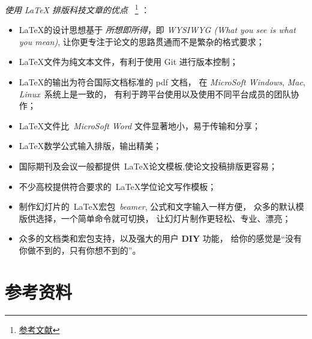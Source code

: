 \documentclass[
    11pt,
    cite=authoryear,
    device=normal,
    lang=cn,
    mode=simple,
    result=answer,
    toc=onecol,
]{elegantbook_sierxue}
\begin{document}
\emph{使用 {\rm\LaTeX{}} 排版科技文章的优点}
~\footnote{\href{https://github.com/HymanHuang/plutothesis/tree/master/PlutoKaiTi/a4paper}{参考文献}}
：
\begin{itemize}
    \item \LaTeX{}的设计思想基于 \emph{所想即所得}，即 \emph{WYSIWYG
        (What you see is what you mean)},
        让你更专注于论文的思路贯通而不是繁杂的格式要求；
    \item \LaTeX 文件为纯文本文件，有利于使用 Git 进行版本控制；
    \item \LaTeX 的输出为符合国际文档标准的 pdf 文档，
        在 \emph{MicroSoft Windows},
        \emph{Mac}, \emph{Linux}~系统上是一致的，
        有利于跨平台使用以及使用不同平台成员的团队协作；
    \item \LaTeX 文件比~\emph{MicroSoft Word} 文件显著地小，易于传输和分享；
    \item \LaTeX 数学公式输入排版，输出精美；
    \item 国际期刊及会议一般都提供~\LaTeX 论文模板,使论文投稿排版更容易；
    \item 不少高校提供符合要求的~\LaTeX{}学位论文写作模板；
    \item 制作幻灯片的~\LaTeX 宏包~\emph{beamer}, 公式和文字输入一样方便，
        众多的默认模版供选择，一个简单命令就可切换，
        让幻灯片制作更轻松、专业、漂亮；
    \item  众多的文档类和宏包支持，以及强大的用户 {\bf DIY} 功能，
          给你的感觉是``没有你做不到的，只有你想不到的''。
\end{itemize}

\newpage
\section{参考资料}%
\label{sec:latex-refs}
\end{document}
